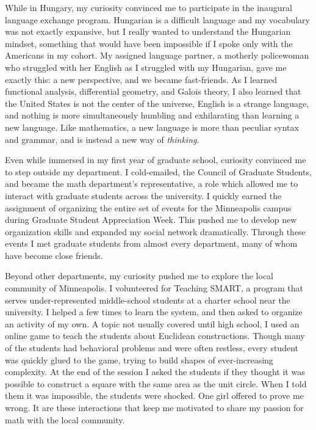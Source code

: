 \documentclass[12pt]{article}
\begin{document}
While in Hungary, my curiosity convinced me to participate in the inaugural language exchange program. Hungarian is a difficult language and my vocabulary was not exactly expansive, but I really wanted to understand the Hungarian mindset, something that would have been impossible if I spoke only with the Americans in my cohort. My assigned language partner, a motherly policewoman who struggled with her English as I struggled with my Hungarian, gave me exactly this: a new perspective, and we became fast-friends. As I learned functional analysis, differential geometry, and Galois theory, I also learned that the United States is not the center of the universe, English is a strange language, and nothing is more simultaneously humbling and exhilarating than learning a new language. Like mathematics, a new language is more than peculiar syntax and grammar, and is instead a new way of \textit{thinking}.  

Even while immersed in my first year of graduate school,  curiosity convinced me to step outside my department. I cold-emailed, the Council of Graduate Students, and became the math department's representative, a role which allowed me to interact with graduate students across the university. I quickly earned the assignment of organizing the entire set  of events for the Minneapolis campus during Graduate Student Appreciation Week. This pushed me to develop new organization skills and expanded my social network dramatically. Through these events I met graduate students from almost every department, many of whom have become close friends. 

Beyond other departments, my curiosity pushed me to explore the local community of Minneapolis. I volunteered for Teaching SMART, a program that serves under-represented middle-school students at a charter school near the university. I helped a few times to learn the system, and then asked to organize an activity of my own. A topic not usually covered until high school, I used an online game to teach the students about Euclidean constructions. Though many of the students had behavioral problems and were often restless, every student was quickly glued to the game, trying to build shapes of ever-increasing complexity. At the end of the session I asked the students if they thought it was possible to construct a square with the same area as the unit circle. When I told them it was impossible, the students were shocked. One girl offered to prove me wrong. It are these interactions that keep me motivated to share my passion for math with the local community. 
\end{document}

